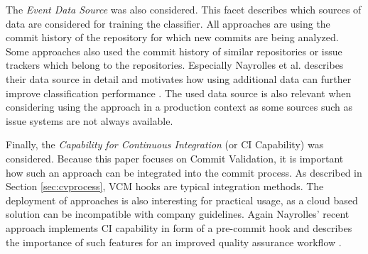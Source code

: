 The \textit{Event Data Source} was also considered. This facet describes which sources of data are considered for training the classifier. All approaches are using the commit history of the repository for which new commits are being analyzed. Some approaches also used the commit history of similar repositories or issue trackers which belong to the repositories.
Especially Nayrolles et al. describes their data source in detail and motivates how using additional data can further improve classification performance \cite{Nayrolles2018}. The used data source is also relevant when considering using the approach in a production context as some sources such as issue systems are not always available. 

Finally, the \textit{Capability for Continuous Integration} (or CI Capability) was considered. Because this paper focuses on Commit Validation, it is important how such an approach can be integrated into the commit process. As described in Section \ref{sec:cvprocess}, VCM hooks are typical integration methods. The deployment of approaches is also interesting for practical usage, as a cloud based solution can be incompatible with company guidelines. Again Nayrolles' recent approach implements CI capability in form of a pre-commit hook and describes the importance of such features for an improved quality assurance workflow \cite{Nayrolles2018}.


